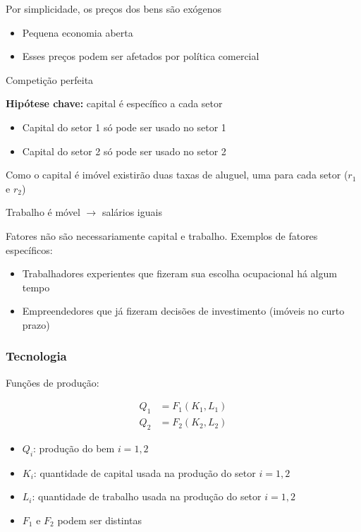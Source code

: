 \documentclass[a4paper,12pt]{article}[abntex2]
\begin{document}
Por simplicidade, os preços dos bens são exógenos
\begin{itemize}
    \item Pequena economia aberta
    \item Esses preços podem ser afetados por política comercial
\end{itemize}

Competição perfeita

\textbf{Hipótese chave:} capital é específico a cada setor
\begin{itemize}
    \item Capital do setor 1 só pode ser usado no setor 1
    \item Capital do setor 2 só pode ser usado no setor 2
\end{itemize}

Como o capital é imóvel existirão duas taxas de aluguel, uma para cada setor ($r_1$ e $r_2$)

Trabalho é móvel $\rightarrow$ salários iguais

Fatores não são necessariamente capital e trabalho. Exemplos de fatores específicos:
\begin{itemize}
    \item Trabalhadores experientes que fizeram sua escolha ocupacional há algum tempo
    \item Empreendedores que já fizeram decisões de investimento (imóveis no curto prazo)
\end{itemize}

\subsubsection{\textbf{Tecnologia}}
Funções de produção:

\begin{align*}
Q_1 &= F_1(K_1, L_1) \\
Q_2 &= F_2(K_2, L_2)
\end{align*}

\begin{itemize}
    \item $Q_i$: produção do bem $i = 1, 2$
    \item $K_i$: quantidade de capital usada na produção do setor $i = 1, 2$
    \item $L_i$: quantidade de trabalho usada na produção do setor $i = 1, 2$
    \item $F_1$ e $F_2$ podem ser distintas
\end{itemize}
\end{document}
